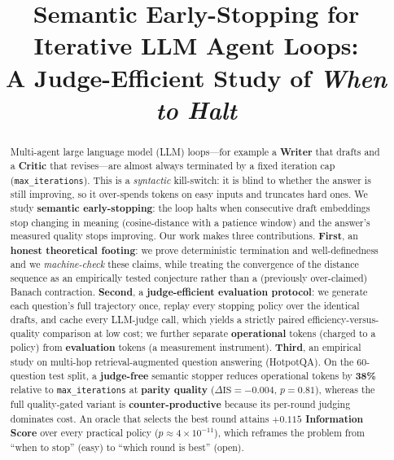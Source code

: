 \documentclass[conference]{IEEEtran}
\begin{document}
\title{Semantic Early-Stopping for Iterative LLM Agent Loops:\\
A Judge-Efficient Study of \emph{When to Halt}}

\author{
}

\maketitle

\begin{abstract}
Multi-agent large language model (LLM) loops---for example a \textbf{Writer} that
drafts and a \textbf{Critic} that revises---are almost always terminated by a fixed
iteration cap (\texttt{max\_iterations}). This is a \emph{syntactic} kill-switch:
it is blind to whether the answer is still improving, so it over-spends tokens on
easy inputs and truncates hard ones. We study \textbf{semantic early-stopping}: the
loop halts when consecutive draft embeddings stop changing in meaning
(cosine-distance with a patience window) and the answer's measured quality stops
improving. Our work makes three contributions. \textbf{First}, an \textbf{honest
theoretical footing}: we prove deterministic termination and well-definedness and
we \emph{machine-check} these claims, while treating the convergence of the
distance sequence as an empirically tested conjecture rather than a (previously
over-claimed) Banach contraction. \textbf{Second}, a \textbf{judge-efficient
evaluation protocol}: we generate each question's full trajectory once, replay
every stopping policy over the identical drafts, and cache every LLM-judge call,
which yields a strictly paired efficiency-versus-quality comparison at low cost; we
further separate \textbf{operational} tokens (charged to a policy) from
\textbf{evaluation} tokens (a measurement instrument). \textbf{Third}, an empirical
study on multi-hop retrieval-augmented question answering (HotpotQA). On the
$60$-question test split, a \textbf{judge-free} semantic stopper reduces operational
tokens by \textbf{38\%} relative to \texttt{max\_iterations} at \textbf{parity
quality} ($\Delta\mathrm{IS}=-0.004$, $p=0.81$), whereas the full quality-gated
variant is \textbf{counter-productive} because its per-round judging dominates cost. An oracle that selects the best round attains
\textbf{$+0.115$ Information Score} over every practical policy
($p\!\approx\!4\times10^{-11}$), which reframes the problem from ``when to stop''
(easy) to ``which round is best'' (open).
\end{abstract}
\end{document}
